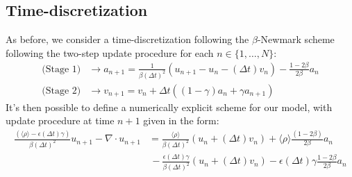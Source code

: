 \subsection{Time-discretization}
As before, we consider a time-discretization following the $\beta$-Newmark scheme following the two-step update procedure for each $n \in \{1,\dots, N\}$:
\begin{align*}
    \text{(Stage 1)} &\longrightarrow a_{n+1} = \frac{1}{\beta (\Delta t)^2} (u_{n+1}-u_{n}-(\Delta t)v_n) - \frac{1-2\beta}{2\beta}a_n\\
    \text{(Stage 2)}& \longrightarrow v_{n+1} = v_n + \Delta t((1-\gamma)a_n + \gamma a_{n+1})
\end{align*}
It's then possible to define a numerically explicit scheme for our model, with update procedure at time $n+1$ given in the form:
\begin{align*}
    \frac{(\langle \rho \rangle- \epsilon (\Delta t) \gamma)}{\beta (\Delta t)^2} u_{n+1} - \nabla \cdot u_{n+1} &= \frac{\langle \rho \rangle}{\beta (\Delta t)^2} (u_n + (\Delta t)v_n) + \langle \rho \rangle\frac{ (1-2\beta)}{2\beta}a_n \\
    & \, - \frac{\epsilon (\Delta t)\gamma}{\beta (\Delta t)^2}(u_n + (\Delta t)v_n) - \epsilon (\Delta t)\gamma\frac{1-2\beta}{2 \beta} a_n
\end{align*}

